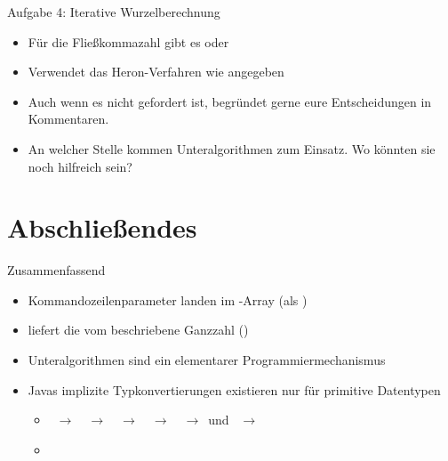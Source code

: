\begin{frame}{Aufgabe 4: Iterative Wurzelberechnung}
    \begin{itemize}[<+(1)->]
        \itemsep10pt
        \item Für die Fließkommazahl gibt es  oder 
        \item Verwendet das Heron-Verfahren wie angegeben 
        \item Auch wenn es nicht gefordert ist, begründet gerne eure Entscheidungen in Kommentaren.
        \item An welcher Stelle kommen Unteralgorithmen zum Einsatz. Wo könnten sie noch hilfreich sein?
    \end{itemize}
\end{frame}


\section{Abschließendes}
{\SummaryFrame
\begin{frame}[t]{Zusammenfassend}
\pause \printBibCommand
\vfill\vfill %
\begin{itemize}[<+(1)->]
    \itemsep14pt
    \item Kommandozeilenparameter landen im -Array (als )
    \item {} liefert die vom  beschriebene Ganzzahl ()
    \item Unteralgorithmen sind ein elementarer Programmiermechanismus
    \item Javas implizite Typkonvertierungen existieren nur für primitive Datentypen \begin{itemize}
        \item {}~\(\to\)~~\(\to\)~~\(\to\)~~\(\to\)~~\(\to\)~\quad und ~\(\to\)~
        \item {}
    \end{itemize}
\end{itemize}
\end{frame}
}



\iffull\fi
